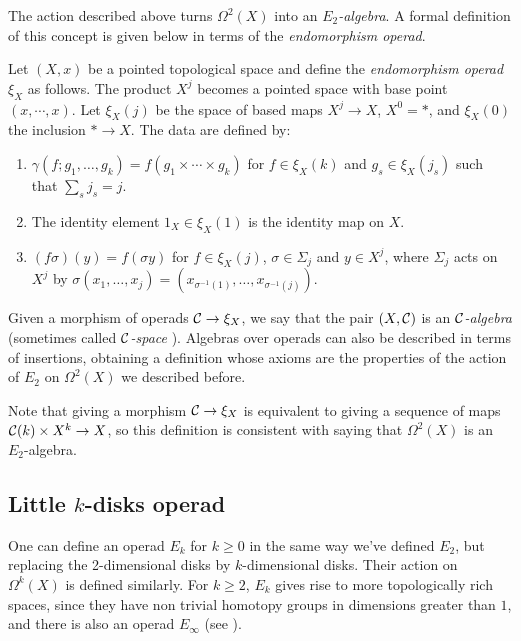 \documentclass[TFM.tex]{subfiles}
\begin{document}
The action described above turns $\Omega^2(X)$ into an \emph{$E_2$-algebra}. A formal definition of this concept is given below in terms of the \emph{endomorphism operad}. 


\begin{defi}\label{endomorphism}
Let $(X,x)$ be a pointed topological space and define the \emph{endomorphism operad} $\xi_X$ as follows. The product $X^j$ becomes a pointed space with base point $(x,\cdots, x)$. Let $\xi_X(j)$ be the space of based maps $X^j\to X$, $X^0=*$, and $\xi_X(0)$ the inclusion $*\to X$. The data are defined by:
\begin{enumerate}
\item $\gamma(f;g_1,\dots, g_k)=f(g_1\times\cdots\times g_k)$ for $f\in \xi_X(k)$ and $g_s\in\xi_X(j_s)$ such that $\sum_s j_s=j$.
\item The identity element $1_X\in\xi_X(1)$ is the identity map on $X$.
\item $(f\sigma)(y)=f(\sigma y)$ for $f\in\xi_X(j)$, $\sigma\in\Sigma_j$ and $y\in X^j$, where $\Sigma_j$ acts on $X^j$ by $\sigma(x_1,\dots, x_j)=(x_{\sigma^{-1}(1)},\dots, x_{\sigma^{-1}(j)})$. 
\end{enumerate}

Given a morphism of operads $\mathcal{C}\to \xi_X$, we say that the pair $(X,\mathcal{C})$ is an \emph{$\mathcal{C}$-algebra} (sometimes called \emph{$\mathcal{C}$-space} \cite{May}). Algebras over operads can also be described in terms of insertions, obtaining a definition whose axioms are the properties of the action of $E_2$ on $\Omega^2(X)$ we described before.
\end{defi}


Note that giving a morphism $\mathcal{C}\to \xi_X$ is equivalent to giving a sequence of maps $\mathcal{C}(k)\times X^k\to X$, so this definition is consistent with saying that $\Omega^2(X)$ is an $E_2$-algebra. 





%
\subsection{Little $k$-disks operad}\label{intervals}

One can define an operad $E_k$ for $k\geq 0$ in the same way we've defined $E_2$, but replacing the 2-dimensional disks by $k$-dimensional disks. Their action on $\Omega^k(X)$ is defined similarly. For $k\geq 2$, $E_k$ gives rise to more topologically rich spaces, since they have non trivial homotopy groups in dimensions greater than $1$, and there is also an operad $E_\infty$ (see \cite{cuentas}). 
\end{document}
